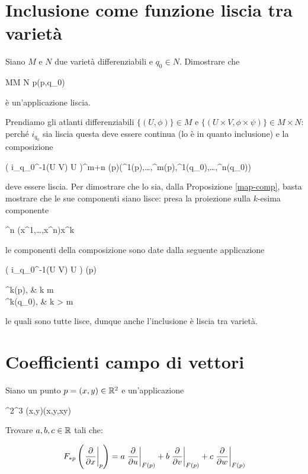 \section{Inclusione come funzione liscia tra varietà}\label{es2-6}

\begin{tcolorbox}
	Siano $ M $ e $ N $ due varietà differenziabili e $ q_{0} \in N $. Dimostrare che
	
		{M}{M \times N}
		{p}{(p,q_{0})}
	
	è un'applicazione liscia.
\end{tcolorbox}

Prendiamo gli atlanti differenziabili $ \{(U,\phi)\} \in M $ e $ \{(U \times V,\phi \times \psi)\} \in M \times N $: perché $ i_{q_{0}} $ sia liscia questa deve essere continua (lo è in quanto inclusione) e la composizione

	{\phi( i_{q_{0}}^{-1}(U \times V) \cap U )}{\R^{m+n}}
	{\phi(p)}{(\phi^{1}(p),\dots,\phi^{m}(p),\psi^{1}(q_{0}),\dots,\psi^{n}(q_{0}))}

deve essere liscia. Per dimostrare che lo sia, dalla Proposizione \ref{map-comp}, basta mostrare che le sue componenti siano lisce: presa la proiezione sulla $ k $-esima componente

	{\R^{n}}{\R}
	{(x^{1},\dots,x^{n})}{x^{k}}

le componenti della composizione sono date dalla seguente applicazione

	{\phi( i_{q_{0}}^{-1}(U \times V) \cap U )}{\R}
	{\phi(p)}{%
				\begin{cases}
					\phi^{k}(p), & k \leqslant m\\
					\psi^{k}(q_{0}), & k > m
				\end{cases}%
				}

le quali sono tutte lisce, dunque anche l'inclusione è liscia tra varietà.

%

\newpage

%

\section{Coefficienti campo di vettori}\label{es2-8}

\begin{tcolorbox}
	Siano un punto $ p = (x,y) \in \mathbb{R}^{2} $ e un'applicazione
	
		{\R^{2}}{\R^{3}}
		{(x,y)}{(x,y,xy)}
	
	Trovare $ a,b,c \in \mathbb{R} $ tali che:
	
	\begin{equation}
		F_{*p} \left( \eval{ \pdv{x} }_{p} \right) = a \eval{ \pdv{u} }_{F(p)} + b \eval{ \pdv{v} }_{F(p)} + c \eval{ \pdv{w} }_{F(p)}
	\end{equation}
\end{tcolorbox}


